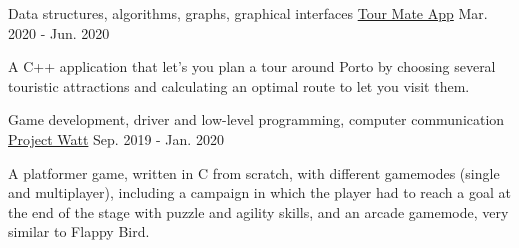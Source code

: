 \begin{cventries}
  \cventry
    {Data structures, algorithms, graphs, graphical interfaces}   
    {\href{https://github.com/Educorreia932/CAL}{Tour Mate App}}   
    {}        
    {Mar. 2020 - Jun. 2020}  
    {
      \begin{cvitems}
        \item {A C++ application that let's you plan a tour around Porto by choosing several touristic attractions and calculating an optimal route to let you visit them.}
      \end{cvitems}
    }
    
  \cventry
    {Game development, driver and low-level programming, computer communication}   
    {\href{https://github.com/Educorreia932/LCOM/tree/master/proj}{Project Watt}}   
    {}        
    {Sep. 2019 - Jan. 2020}  
    {
      \begin{cvitems}
        \item {A platformer game, written in C from scratch, with different gamemodes (single and multiplayer), including a campaign in which the player had to reach a goal at the end of the stage with puzzle and agility skills, and an arcade gamemode, very similar to Flappy Bird.}
      \end{cvitems}
    }

\end{cventries}
